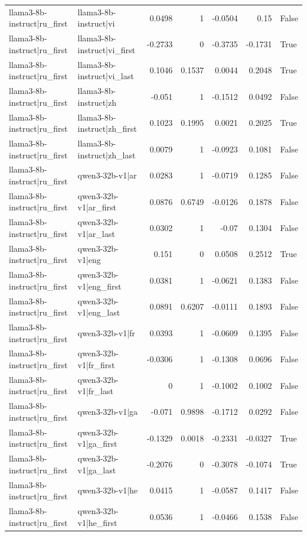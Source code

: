 \begin{table}
\begin{tabular}{l l r r r r l}
llama3-8b-instruct|ru_first & llama3-8b-instruct|vi & 0.0498 & 1 & -0.0504 & 0.15 & False \\
llama3-8b-instruct|ru_first & llama3-8b-instruct|vi_first & -0.2733 & 0 & -0.3735 & -0.1731 & True \\
llama3-8b-instruct|ru_first & llama3-8b-instruct|vi_last & 0.1046 & 0.1537 & 0.0044 & 0.2048 & True \\
llama3-8b-instruct|ru_first & llama3-8b-instruct|zh & -0.051 & 1 & -0.1512 & 0.0492 & False \\
llama3-8b-instruct|ru_first & llama3-8b-instruct|zh_first & 0.1023 & 0.1995 & 0.0021 & 0.2025 & True \\
llama3-8b-instruct|ru_first & llama3-8b-instruct|zh_last & 0.0079 & 1 & -0.0923 & 0.1081 & False \\
llama3-8b-instruct|ru_first & qwen3-32b-v1|ar & 0.0283 & 1 & -0.0719 & 0.1285 & False \\
llama3-8b-instruct|ru_first & qwen3-32b-v1|ar_first & 0.0876 & 0.6749 & -0.0126 & 0.1878 & False \\
llama3-8b-instruct|ru_first & qwen3-32b-v1|ar_last & 0.0302 & 1 & -0.07 & 0.1304 & False \\
llama3-8b-instruct|ru_first & qwen3-32b-v1|eng & 0.151 & 0 & 0.0508 & 0.2512 & True \\
llama3-8b-instruct|ru_first & qwen3-32b-v1|eng_first & 0.0381 & 1 & -0.0621 & 0.1383 & False \\
llama3-8b-instruct|ru_first & qwen3-32b-v1|eng_last & 0.0891 & 0.6207 & -0.0111 & 0.1893 & False \\
llama3-8b-instruct|ru_first & qwen3-32b-v1|fr & 0.0393 & 1 & -0.0609 & 0.1395 & False \\
llama3-8b-instruct|ru_first & qwen3-32b-v1|fr_first & -0.0306 & 1 & -0.1308 & 0.0696 & False \\
llama3-8b-instruct|ru_first & qwen3-32b-v1|fr_last & 0 & 1 & -0.1002 & 0.1002 & False \\
llama3-8b-instruct|ru_first & qwen3-32b-v1|ga & -0.071 & 0.9898 & -0.1712 & 0.0292 & False \\
llama3-8b-instruct|ru_first & qwen3-32b-v1|ga_first & -0.1329 & 0.0018 & -0.2331 & -0.0327 & True \\
llama3-8b-instruct|ru_first & qwen3-32b-v1|ga_last & -0.2076 & 0 & -0.3078 & -0.1074 & True \\
llama3-8b-instruct|ru_first & qwen3-32b-v1|he & 0.0415 & 1 & -0.0587 & 0.1417 & False \\
llama3-8b-instruct|ru_first & qwen3-32b-v1|he_first & 0.0536 & 1 & -0.0466 & 0.1538 & False \\

\end{tabular}
\end{table}
